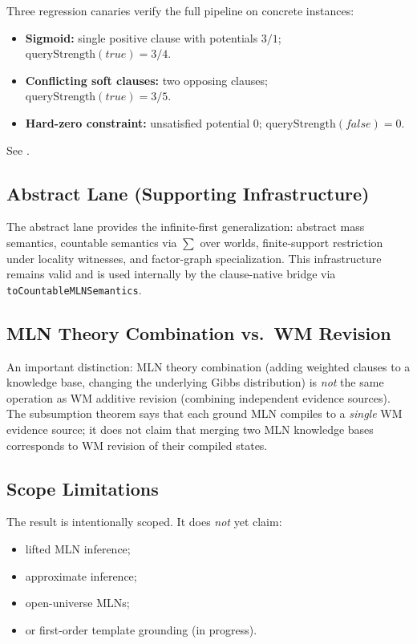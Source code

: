 \documentclass[11pt,openany]{report}
\begin{document}
Three regression canaries verify the full pipeline on concrete instances:
\begin{itemize}
\item \textbf{Sigmoid:} single positive clause with potentials $3/1$;
  $\mathrm{queryStrength}(\textit{true}) = 3/4$.
\item \textbf{Conflicting soft clauses:} two opposing clauses;
  $\mathrm{queryStrength}(\textit{true}) = 3/5$.
\item \textbf{Hard-zero constraint:} unsatisfied potential $0$;
  $\mathrm{queryStrength}(\textit{false}) = 0$.
\end{itemize}
See .

\subsection{Abstract Lane (Supporting Infrastructure)}

The abstract lane provides the infinite-first generalization: abstract
mass semantics, countable semantics via $\sum$ over worlds,
finite-support restriction under locality witnesses, and factor-graph
specialization.  This infrastructure remains valid and is used internally
by the clause-native bridge via \texttt{toCountableMLNSemantics}.

\subsection{MLN Theory Combination vs.\ WM Revision}

An important distinction: MLN theory combination (adding weighted
clauses to a knowledge base, changing the underlying Gibbs distribution)
is \emph{not} the same operation as WM additive revision (combining
independent evidence sources).  The subsumption theorem says that each
ground MLN compiles to a \emph{single} WM evidence source; it does not
claim that merging two MLN knowledge bases corresponds to WM revision of
their compiled states.

\subsection{Scope Limitations}

The result is intentionally scoped.  It does \emph{not} yet claim:
\begin{itemize}
\item lifted MLN inference;
\item approximate inference;
\item open-universe MLNs;
\item or first-order template grounding (in progress).
\end{itemize}
\end{document}
